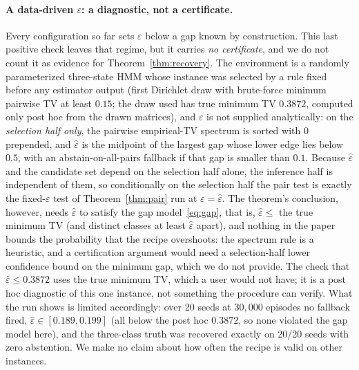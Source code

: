 \documentclass{article}
\newcommand{\eps}{\varepsilon}
\begin{document}
\paragraph{A data-driven $\eps$: a diagnostic, not a certificate.}
Every configuration so far sets $\eps$ below a gap known by construction.
This last positive check leaves that regime, but it carries \emph{no
certificate}, and we do not count it as evidence for
Theorem~\ref{thm:recovery}.  The environment is a randomly parameterized
three-state HMM whose instance was selected by a rule fixed before any
estimator output (first Dirichlet draw with brute-force minimum pairwise TV
at least $0.15$; the draw used has true minimum TV $0.3872$, computed only
post hoc from the drawn matrices), and $\eps$ is not supplied analytically:
on the \emph{selection half only}, the pairwise empirical-TV spectrum is
sorted with $0$ prepended, and $\widehat\eps$ is the midpoint of the largest
gap whose lower edge lies below $0.5$, with an abstain-on-all-pairs fallback
if that gap is smaller than $0.1$.  Because $\widehat\eps$ and the candidate
set depend on the selection half alone, the inference half is independent of
them, so conditionally on the selection half the pair test is exactly the
fixed-$\eps$ test of Theorem~\ref{thm:pair} run at $\eps=\widehat\eps$.  The
theorem's conclusion, however, needs $\widehat\eps$ to satisfy the gap
model~\eqref{eq:gap}, that is, $\widehat\eps\le$ the true minimum TV
(and distinct classes at least $\widehat\eps$ apart), and nothing in the
paper bounds the probability that the recipe overshoots: the spectrum rule is
a heuristic, and a certification argument would need a selection-half
lower confidence bound on the minimum gap, which we do not provide.  The
check that $\widehat\eps\le0.3872$ uses the true minimum TV, which a user
would not have; it is a post hoc diagnostic of this one instance, not
something the procedure can verify.  What the run shows is limited
accordingly: over 20 seeds at $30{,}000$ episodes no fallback fired,
$\widehat\eps\in[0.189,0.199]$ (all below the post hoc $0.3872$, so none
violated the gap model here), and the three-class truth was recovered
exactly on 20/20 seeds with zero abstention.  We make no claim about how
often the recipe is valid on other instances.
\end{document}
